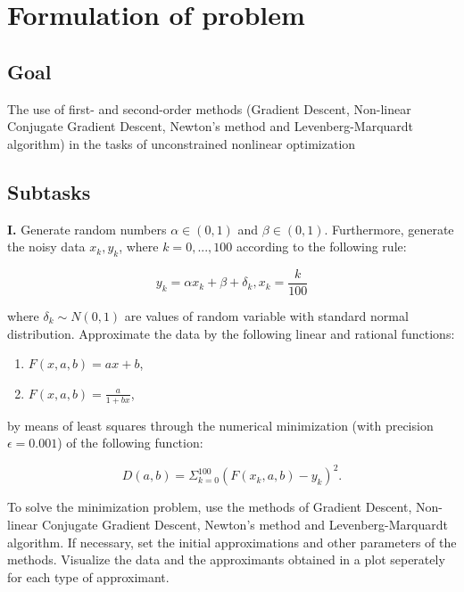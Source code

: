 \section*{Formulation of problem}

\subsection*{Goal}
The use of first- and second-order methods (Gradient Descent, Non-linear Conjugate Gradient Descent, Newton's method and Levenberg-Marquardt algorithm) in the tasks of unconstrained nonlinear
optimization
\subsection*{Subtasks}
\textbf{I.} Generate random numbers $\alpha \in (0, 1)$ and $\beta \in (0, 1)$. Furthermore, generate the noisy data ${x_k, y_k}$, where $k = 0, ..., 100$ according to the following rule:

\begin{equation*}
    y_k = \alpha x_k + \beta + \delta_k, x_k = \frac{k}{100}
\end{equation*}

where $\delta_k \sim N(0, 1)$ are values of random variable with standard normal distribution. Approximate the data by the following linear and rational functions:

\begin{enumerate}
    \item $F(x, a, b) = ax + b$,
    \item $F(x, a, b) = \frac{a}{1 + bx}$,
\end{enumerate}

by means of least squares through the numerical minimization (with precision $\epsilon = 0.001$) of the following function:

\begin{equation*}
    D(a, b) = \Sigma_{k=0}^{100} (F(x_k, a, b) - y_k)^2.
\end{equation*}

To solve the minimization problem, use the methods of Gradient Descent, Non-linear Conjugate Gradient Descent, Newton's method and Levenberg-Marquardt algorithm. If necessary, set the initial approximations and other parameters of the methods.
Visualize the data and the approximants obtained in a plot seperately for each type of approximant.